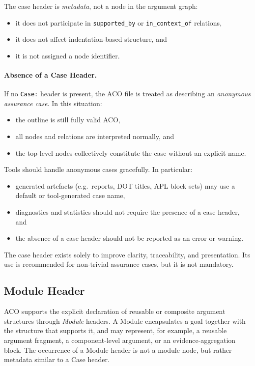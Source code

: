 \documentclass[11pt]{article}
\begin{document}
The case header is \emph{metadata}, not a node in the argument graph:
\begin{itemize}[leftmargin=2em]
  \item it does not participate in \texttt{supported\_by} or \texttt{in\_context\_of} relations,
  \item it does not affect indentation-based structure, and
  \item it is not assigned a node identifier.
\end{itemize}

\paragraph{Absence of a Case Header.}
If no \texttt{Case:} header is present, the ACO file is treated as describing an
\emph{anonymous assurance case}. In this situation:
\begin{itemize}[leftmargin=2em]
  \item the outline is still fully valid ACO,
  \item all nodes and relations are interpreted normally, and
  \item the top-level nodes collectively constitute the case without an explicit name.
\end{itemize}

Tools should handle anonymous cases gracefully. In particular:
\begin{itemize}[leftmargin=2em]
  \item generated artefacts (e.g.\ reports, DOT titles, APL block sets) may use
        a default or tool-generated case name,
  \item diagnostics and statistics should not require the presence of a case header, and
  \item the absence of a case header should not be reported as an error or warning.
\end{itemize}

The case header exists solely to improve clarity, traceability, and presentation.
Its use is recommended for non-trivial assurance cases, but it is not mandatory.

\subsection{Module Header}

ACO supports the explicit declaration of reusable or composite argument structures through
\emph{Module} headers. A Module encapsulates a goal together with the structure that supports it,
and may represent, for example, a reusable argument fragment, a component-level argument,
or an evidence-aggregation block.
The occurrence of a Module header is not a module node, but rather metadata similar to a Case header.
%
\end{document}
